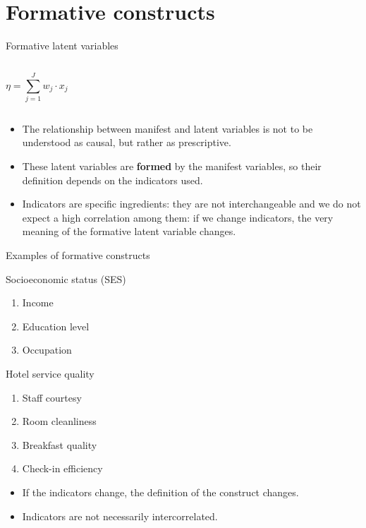 \documentclass{beamer}
\begin{document}
\section{Formative constructs}
\begin{frame}{Formative latent variables}
        \begin{columns}
    \[
    \eta = \sum_{j=1}^{J} w_{j} \cdot x_{j}
    \]
    \end{columns}
    \vspace{1em}
    \pause
    \small
    \begin{itemize}
        \item The relationship between manifest and latent variables is not to be understood as causal, but rather as prescriptive.
        \item These latent variables are \textbf{formed} by the manifest variables, so their definition depends on the indicators used.
        \item Indicators are specific ingredients: they are not interchangeable and we do not expect a high correlation among them: if we change indicators, the very meaning of the formative latent variable changes.
    \end{itemize}
\end{frame}

\begin{frame}{Examples of formative constructs}
\begin{block}{Socioeconomic status (SES)}
    \begin{enumerate}
        \item Income
        \item Education level
        \item Occupation
    \end{enumerate}
\end{block}
\begin{block}{Hotel service quality}
    \begin{enumerate}
        \item Staff courtesy
        \item Room cleanliness
        \item Breakfast quality
        \item Check-in efficiency
    \end{enumerate}
\end{block}
\small
\begin{itemize}
    \item If the indicators change, the definition of the construct changes.
    \item Indicators are not necessarily intercorrelated.
\end{itemize}
\end{frame}
\end{document}
